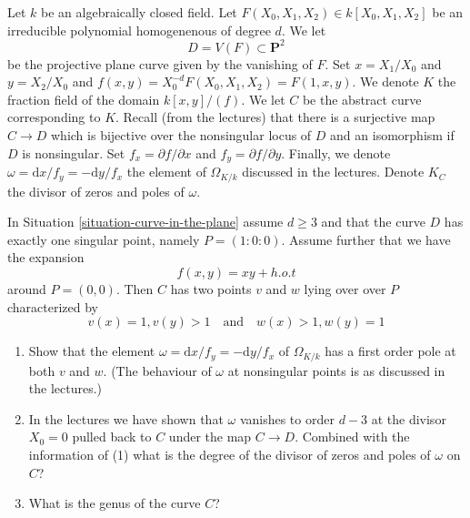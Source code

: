 \begin{situation}
\label{situation-curve-in-the-plane}
Let $k$ be an algebraically closed field. Let
$F(X_0, X_1, X_2) \in k[X_0, X_1, X_2]$ be an irreducible polynomial
homogenenous of degree $d$. We let
$$
D = V(F) \subset \mathbf{P}^2
$$
be the projective plane curve given by the vanishing of $F$.
Set $x = X_1/X_0$ and $y = X_2/X_0$ and
$f(x, y) = X_0^{-d}F(X_0, X_1, X_2) = F(1, x, y)$.
We denote $K$ the fraction field of the domain $k[x, y]/(f)$.
We let $C$ be the abstract curve corresponding to $K$.
Recall (from the lectures) that there is a surjective map $C \to D$
which is bijective over the nonsingular locus of $D$ and an
isomorphism if $D$ is nonsingular.
Set $f_x = \partial f/\partial x$ and $f_y = \partial f/\partial y$.
Finally, we denote $\omega = \text{d}x/f_y = - \text{d}y/f_x$ the
element of $\Omega_{K/k}$ discussed in the lectures.
Denote $K_C$ the divisor of zeros and poles of $\omega$.
\end{situation}

\begin{exercise}
\label{exercise-node-in-the-plane}
In Situation \ref{situation-curve-in-the-plane} assume
$d \geq 3$ and that the curve $D$ has exactly one singular point,
namely $P = (1 : 0 : 0)$. Assume further that we have the expansion
$$
f(x, y) = xy + h.o.t
$$
around $P = (0, 0)$. Then $C$ has two points $v$ and $w$ lying over
over $P$ characterized by
$$
v(x) = 1, v(y) > 1
\quad\text{and}\quad
w(x) > 1, w(y) = 1
$$
\begin{enumerate}
\item Show that the element
$\omega = \text{d}x/f_y = - \text{d}y/f_x$ of $\Omega_{K/k}$
has a first order pole at both $v$ and $w$. (The behaviour of
$\omega$ at nonsingular points is as discussed in the lectures.)
\item In the lectures we have shown that $\omega$ vanishes to order
$d - 3$ at the divisor $X_0 = 0$ pulled back to $C$ under the map
$C \to D$. Combined with the information of (1) what is the degree
of the divisor of zeros and poles of $\omega$ on $C$?
\item What is the genus of the curve $C$?
\end{enumerate}
\end{exercise}

